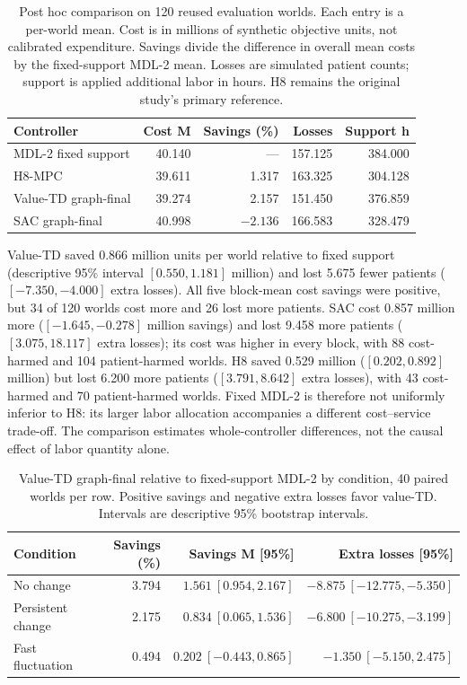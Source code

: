\documentclass[preprint,review,12pt]{elsarticle}
\begin{document}
\begin{table}[tbp]
\centering
\caption{Post hoc comparison on 120 reused evaluation worlds. Each entry is
a per-world mean. Cost is in millions of synthetic objective units, not
calibrated expenditure. Savings divide the difference in overall mean costs
by the fixed-support MDL-2 mean. Losses are simulated patient counts;
support is applied additional labor in hours. H8 remains the original
study's primary reference.}
\label{tab:mdl2-fixed-overall}
\small
\setlength{\tabcolsep}{4pt}
\begin{tabularx}{\textwidth}{Xrrrr}
\toprule
Controller & Cost M & Savings (\%) & Losses & Support h \\
\midrule
MDL-2 fixed support & 40.140 & --- & 157.125 & 384.000 \\
H8-MPC & 39.611 & 1.317 & 163.325 & 304.128 \\
Value-TD graph-final & 39.274 & 2.157 & 151.450 & 376.859 \\
SAC graph-final & 40.998 & $-2.136$ & 166.583 & 328.479 \\
\bottomrule
\end{tabularx}
\end{table}

Value-TD saved 0.866 million units per world relative to fixed support
(descriptive 95\% interval $[0.550,1.181]$ million) and lost 5.675 fewer
patients ($[-7.350,-4.000]$ extra losses). All five block-mean cost savings
were positive, but 34 of 120 worlds cost more and 26 lost more patients.
SAC cost 0.857 million more ($[-1.645,-0.278]$ million savings) and lost
9.458 more patients ($[3.075,18.117]$ extra losses); its cost was higher
in every block, with 88 cost-harmed and 104 patient-harmed worlds.
H8 saved 0.529 million ($[0.202,0.892]$ million) but lost 6.200 more
patients ($[3.791,8.642]$ extra losses), with 43 cost-harmed and 70
patient-harmed worlds. Fixed MDL-2 is therefore not uniformly inferior to
H8: its larger labor allocation accompanies a different cost--service
trade-off. The comparison estimates whole-controller differences, not the
causal effect of labor quantity alone.

\begin{table}[tbp]
\centering
\caption{Value-TD graph-final relative to fixed-support MDL-2 by condition,
40 paired worlds per row. Positive savings and negative extra losses favor
value-TD. Intervals are descriptive 95\% bootstrap intervals.}
\label{tab:mdl2-fixed-conditions}
\small
\setlength{\tabcolsep}{3pt}
\begin{tabularx}{\textwidth}{Xrrr}
\toprule
Condition & Savings (\%) & Savings M [95\%] & Extra losses [95\%] \\
\midrule
No change & 3.794 & $1.561\ [0.954,2.167]$ & $-8.875\ [-12.775,-5.350]$ \\
Persistent change & 2.175 & $0.834\ [0.065,1.536]$ & $-6.800\ [-10.275,-3.199]$ \\
Fast fluctuation & 0.494 & $0.202\ [-0.443,0.865]$ & $-1.350\ [-5.150,2.475]$ \\
\bottomrule
\end{tabularx}
\end{table}
\end{document}
